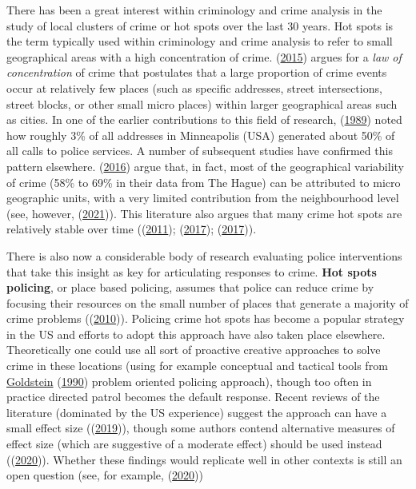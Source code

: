 \documentclass[
  krantz2]{krantz}
\begin{document}
There has been a great interest within criminology and crime analysis in the study of local clusters of crime or hot spots over the last 30 years. Hot spots is the term typically used within criminology and crime analysis to refer to small geographical areas with a high concentration of crime. (\protect\hyperlink{ref-Weisburd_2015}{2015}) argues for a \emph{law of concentration} of crime that postulates that a large proportion of crime events occur at relatively few places (such as specific addresses, street intersections, street blocks, or other small micro places) within larger geographical areas such as cities. In one of the earlier contributions to this field of research, (\protect\hyperlink{ref-Sherman_1989}{1989}) noted how roughly 3\% of all addresses in Minneapolis (USA) generated about 50\% of all calls to police services. A number of subsequent studies have confirmed this pattern elsewhere. (\protect\hyperlink{ref-Steenbeek_2016}{2016}) argue that, in fact, most of the geographical variability of crime (58\% to 69\% in their data from The Hague) can be attributed to micro geographic units, with a very limited contribution from the neighbourhood level (see, however, (\protect\hyperlink{ref-Ramos_2021}{2021})). This literature also argues that many crime hot spots are relatively stable over time ((\protect\hyperlink{ref-Andresen_2011b}{2011}); (\protect\hyperlink{ref-Andresen_2017}{2017}); (\protect\hyperlink{ref-Andresen_2017b}{2017})).

There is also now a considerable body of research evaluating police interventions that take this insight as key for articulating responses to crime. \textbf{Hot spots policing}, or place based policing, assumes that police can reduce crime by focusing their resources on the small number of places that generate a majority of crime problems ((\protect\hyperlink{ref-Braga_2010}{2010})). Policing crime hot spots has become a popular strategy in the US and efforts to adopt this approach have also taken place elsewhere. Theoretically one could use all sort of proactive creative approaches to solve crime in these locations (using for example conceptual and tactical tools from \protect\hyperlink{ref-Goldstein_1990}{Goldstein} (\protect\hyperlink{ref-Goldstein_1990}{1990}) problem oriented policing approach), though too often in practice directed patrol becomes the default response. Recent reviews of the literature (dominated by the US experience) suggest the approach can have a small effect size ((\protect\hyperlink{ref-Braga_2019}{2019})), though some authors contend alternative measures of effect size (which are suggestive of a moderate effect) should be used instead ((\protect\hyperlink{ref-Braga_2020}{2020})). Whether these findings would replicate well in other contexts is still an open question (see, for example, (\protect\hyperlink{ref-Collazos_2020}{2020}))
\end{document}
